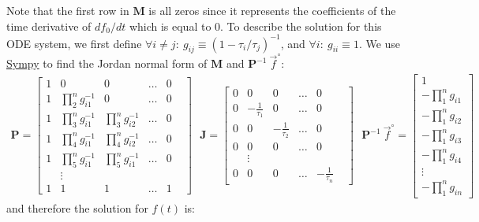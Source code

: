 \documentclass{article}
\newcommand{\finit}{\ensuremath{\vec{f}^\circ}}
\begin{document}
Note that the first row in $\mathbf{M}$ is all zeros since it represents the coefficients of the time derivative of $d f_0/dt$ which is equal to $0$. To describe the solution for this ODE system, we first define $\forall i \neq j:~g_{ij} \equiv (1 - \tau_i/\tau_j)^{-1}$, and $\forall i:~g_{ii} \equiv 1$. We use \href{https://www.sympy.org/}{Sympy} to find the Jordan normal form of $\mathbf{M}$ and $\mathbf{P}^{-1} ~\finit$:
\begin{eqnarray}
\mathbf{P} =
  \begin{bmatrix}
    1 & 0 & 0 & \ldots & 0 \\
    1 & \prod_2^n g_{i1}^{-1} & 0 & \ldots & 0 \\
    1 & \prod_3^n g_{i1}^{-1} & \prod_3^n g_{i2}^{-1} & \ldots & 0 \\
    1 & \prod_4^n g_{i1}^{-1} & \prod_4^n g_{i2}^{-1} & \ldots & 0 \\
    1 & \prod_5^n g_{i1}^{-1} & \prod_5^n g_{i1}^{-1} & \ldots & 0 \\
     & \vdots & & & & \\
    1 & 1 & 1 & \ldots & 1
\end{bmatrix}
~~~
\mathbf{J} =
  \begin{bmatrix}
    0 & 0 & 0 & \ldots & 0 \\
    0 & -\frac{1}{\tau_1} & 0 & \ldots & 0 \\
    0 & 0 & -\frac{1}{\tau_2} & \ldots & 0 \\
    0 & 0 & 0 & \ldots & 0 \\
     & \vdots & & & & \\
    0 & 0 & 0 & \ldots & -\frac{1}{\tau_n}
\end{bmatrix}
~~~
\mathbf{P}^{-1} ~\finit = 
	\begin{bmatrix}
	1 \\
	-\prod_1^n g_{i1} \\
	-\prod_1^n g_{i2} \\
	-\prod_1^n g_{i3} \\
	-\prod_1^n g_{i4} \\
	\vdots \\
	-\prod_1^n g_{in}
	\end{bmatrix}
\end{eqnarray}
and therefore the solution for $f(t)$ is:
\end{document}
